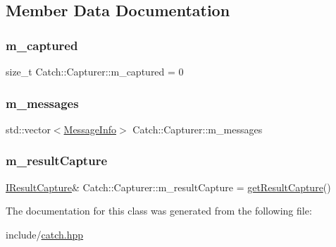 \subsection{Member Data Documentation}
\mbox{\label{class_catch_1_1_capturer_a1c3bea0fde97a7663ece4b81187fa9ed}} 
\subsubsection{\texorpdfstring{m\_captured}{m\_captured}}
{\footnotesize\ttfamily size\+\_\+t Catch\+::\+Capturer\+::m\+\_\+captured = 0\hspace{0.3cm}{\ttfamily [private]}}

\mbox{\label{class_catch_1_1_capturer_aefa14693d28906e5e7b06975af38aaed}} 
\subsubsection{\texorpdfstring{m\_messages}{m\_messages}}
{\footnotesize\ttfamily std\+::vector$<$\mbox{\hyperlink{struct_catch_1_1_message_info}{Message\+Info}}$>$ Catch\+::\+Capturer\+::m\+\_\+messages\hspace{0.3cm}{\ttfamily [private]}}

\mbox{\label{class_catch_1_1_capturer_a29edecce81d56837945ba2585c0ff941}} 
\subsubsection{\texorpdfstring{m\_resultCapture}{m\_resultCapture}}
{\footnotesize\ttfamily \mbox{\hyperlink{struct_catch_1_1_i_result_capture}{I\+Result\+Capture}}\& Catch\+::\+Capturer\+::m\+\_\+result\+Capture = \mbox{\hyperlink{namespace_catch_aff60c1de6ac6cea30175d70e33d83c8e}{get\+Result\+Capture}}()\hspace{0.3cm}{\ttfamily [private]}}



The documentation for this class was generated from the following file\+:\begin{DoxyCompactItemize}
\item 
include/\mbox{\hyperlink{catch_8hpp}{catch.\+hpp}}\end{DoxyCompactItemize}
